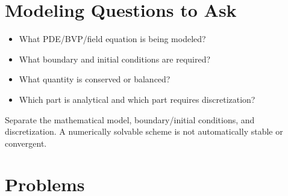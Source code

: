 \documentclass[11pt]{book}
\begin{document}
\section*{Modeling Questions to Ask}\begin{itemize}
\item What PDE/BVP/field equation is being modeled?
\item What boundary and initial conditions are required?
\item What quantity is conserved or balanced?
\item Which part is analytical and which part requires discretization?
\end{itemize}
\begin{errorbox}Separate the mathematical model, boundary/initial conditions, and discretization. A numerically solvable scheme is not automatically stable or convergent.\end{errorbox}
\section*{Problems}
\end{document}
